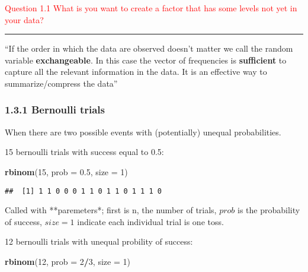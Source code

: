 \documentclass[]{article}
\newenvironment{Shaded}{\begin{snugshade}}{\end{snugshade}}
\newcommand{\KeywordTok}[1]{\textcolor[rgb]{0.13,0.29,0.53}{\textbf{#1}}}
\newcommand{\DataTypeTok}[1]{\textcolor[rgb]{0.13,0.29,0.53}{#1}}
\newcommand{\DecValTok}[1]{\textcolor[rgb]{0.00,0.00,0.81}{#1}}
\newcommand{\FloatTok}[1]{\textcolor[rgb]{0.00,0.00,0.81}{#1}}
\newcommand{\StringTok}[1]{\textcolor[rgb]{0.31,0.60,0.02}{#1}}
\newcommand{\OperatorTok}[1]{\textcolor[rgb]{0.81,0.36,0.00}{\textbf{#1}}}
\newcommand{\NormalTok}[1]{#1}
\let\oldrule=\rule
\renewcommand{\rule}[1]{\oldrule{\linewidth}}
\begin{document}
\textcolor{red}{Question 1.1  What is you want to create a factor that has some levels not yet in your data?}

\begin{Shaded}
\end{Shaded}

\begin{center}\rule{0.5\linewidth}{\linethickness}\end{center}

``If the order in which the data are observed doesn't matter we call the
random variable \textbf{exchangeable}. In this case the vector of
frequencies is \textbf{sufficient} to capture all the relevant
information in the data. It is an effective way to summarize/compress
the data''

\subsubsection{1.3.1 Bernoulli trials}\label{bernoulli-trials}

When there are two possible events with (potentially) unequal
probabilities.

15 bernoulli trials with success equal to 0.5:

\begin{Shaded}
\begin{Highlighting}[]
\KeywordTok{rbinom}\NormalTok{(}\DecValTok{15}\NormalTok{, }\DataTypeTok{prob =} \FloatTok{0.5}\NormalTok{, }\DataTypeTok{size =} \DecValTok{1}\NormalTok{)}
\end{Highlighting}
\end{Shaded}

\begin{verbatim}
##  [1] 1 1 0 0 0 1 1 0 1 1 0 1 1 1 0
\end{verbatim}

Called with **paremeters*; first is n, the number of trials, \(prob\) is
the probability of success, \(size = 1\) indicate each individual trial
is one toss.

12 bernoulli trials with unequal probility of success:

\begin{Shaded}
\begin{Highlighting}[]
\KeywordTok{rbinom}\NormalTok{(}\DecValTok{12}\NormalTok{, }\DataTypeTok{prob =} \DecValTok{2}\OperatorTok{/}\DecValTok{3}\NormalTok{, }\DataTypeTok{size =} \DecValTok{1}\NormalTok{)}
\end{Highlighting}
\end{Shaded}
\end{document}

